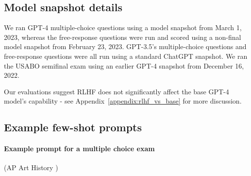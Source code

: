 \documentclass{article}
\begin{document}
\subsection{Model snapshot details} 
We ran GPT-4 multiple-choice questions using a model snapshot from March 1, 2023, whereas the free-response questions were run and scored using a non-final model snapshot from February 23, 2023. GPT-3.5's multiple-choice questions and free-response questions were all run using a standard ChatGPT snapshot. We ran the USABO semifinal exam using an earlier GPT-4 snapshot from December 16, 2022.

Our evaluations suggest RLHF does not significantly affect the base GPT-4 model's capability - see Appendix~\ref{appendix:rlhf_vs_base} for more discussion.

\subsection{Example few-shot prompts}\label{sec:prompt_example}

\paragraph{Example prompt for a multiple choice exam} (AP Art History \cite{nici2020ap})
\end{document}
